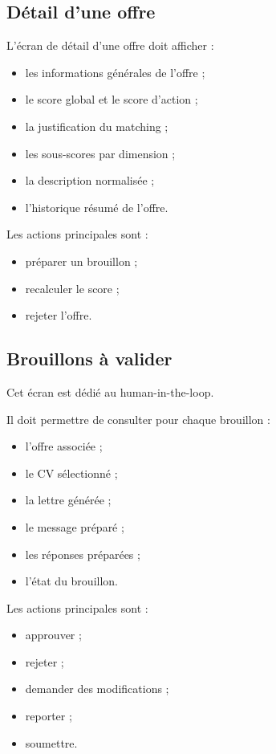 \documentclass[11pt,a4paper]{article}
\begin{document}
\subsection{Détail d’une offre}

L’écran de détail d’une offre doit afficher :

\begin{itemize}
    \item les informations générales de l’offre ;
    \item le score global et le score d’action ;
    \item la justification du matching ;
    \item les sous-scores par dimension ;
    \item la description normalisée ;
    \item l’historique résumé de l’offre.
\end{itemize}

Les actions principales sont :

\begin{itemize}
    \item préparer un brouillon ;
    \item recalculer le score ;
    \item rejeter l’offre.
\end{itemize}

\subsection{Brouillons à valider}

Cet écran est dédié au human-in-the-loop.

Il doit permettre de consulter pour chaque brouillon :

\begin{itemize}
    \item l’offre associée ;
    \item le CV sélectionné ;
    \item la lettre générée ;
    \item le message préparé ;
    \item les réponses préparées ;
    \item l’état du brouillon.
\end{itemize}

Les actions principales sont :

\begin{itemize}
    \item approuver ;
    \item rejeter ;
    \item demander des modifications ;
    \item reporter ;
    \item soumettre.
\end{itemize}
\end{document}

